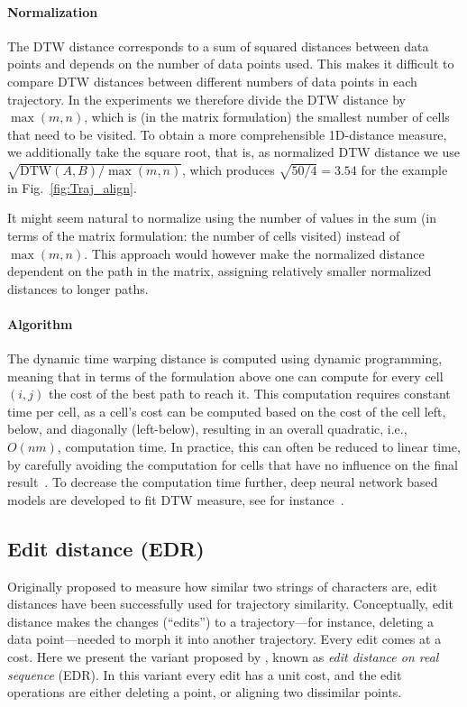 \documentclass{interact}
\newcommand{\DTW}{\ensuremath{\text{DTW}}}
\begin{document}
\paragraph*{Normalization}
The DTW distance corresponds to a sum of squared distances between data points and depends on the number of data points used. This makes it difficult to compare DTW distances between different numbers of data points in each trajectory. In the experiments we therefore divide the DTW distance by $\max (m,n)$, which is (in the matrix formulation) the smallest number of cells that need to be visited. To obtain a more comprehensible 1D-distance measure, we additionally take the square root, that is, as normalized DTW distance we use $\sqrt{\DTW(A, B)/\max (m,n)}$, which produces $\sqrt{50/4}=3.54$ for the example in Fig.~\ref{fig:Traj_align}.

It might seem natural to normalize using the number of values in the sum (in terms of the matrix formulation: the number of cells visited) instead of $\max (m,n)$. This approach would however make the normalized distance dependent on the path in the matrix, assigning relatively smaller normalized distances to longer paths.

\paragraph*{Algorithm}
The dynamic time warping distance is computed using dynamic programming, meaning that in terms of the formulation above one can compute for every cell $(i,j)$ the cost of the best path to reach it. This computation requires constant time per cell, as a cell's cost can be computed based on the cost of the cell left, below, and diagonally (left-below), resulting in an overall quadratic, i.e., $O(nm)$, computation time.
In practice, this can often be reduced to linear time, by carefully avoiding the computation for cells that have no influence on the final result~\citep{keogh2005exact}.
To decrease the computation time further, deep neural network based models are developed to fit DTW measure, see for instance~\citep{zhang2019deep}.


\subsection{Edit distance (EDR)}
Originally proposed to measure how similar two strings of characters are, edit distances have been successfully used for trajectory similarity. Conceptually, edit distance makes the changes (``edits'') to a trajectory---for instance, deleting a data point---needed to morph it into another trajectory. Every edit comes at a cost. Here we present the variant proposed by \cite{ChenOO05}, known as \emph{edit distance on real sequence} (EDR). In this variant every edit has a unit cost, and the edit operations are either deleting a point, or aligning two dissimilar points.
\end{document}

